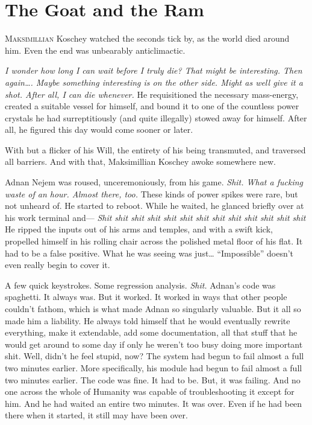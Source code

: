 \chapter{The Goat and the Ram}


\lettrine{M}{aksimillian} Koschey watched the seconds tick by, as the world died around him. Even the end was unbearably anticlimactic.

\emph{I wonder how long I can wait before I truly die? That might be interesting. Then again…. Maybe something interesting is on the other side. Might as well give it a shot. After all, I can die whenever.}
\SmallVSpace
He requisitioned the necessary mass-energy, created a suitable vessel for himself, and bound it to one of the countless power crystals he had surreptitiously (and quite illegally) stowed away for himself. After all, he figured this day would come sooner or later.

With but a flicker of his Will, the entirety of his being transmuted, and traversed all barriers.
\SomeVSpace
And with that, Maksimillian Koschey awoke somewhere new.
\simpleline
{}

Adnan Nejem was roused, unceremoniously, from his game.
\SmallVSpace
\emph{Shit. What a fucking waste of an hour. Almost there, too.}
\SmallVSpace
These kinds of power spikes were rare, but not unheard of. He started to reboot. While he waited, he glanced briefly over at his work terminal and\mbox{---}
\SmallVSpace
\emph{Shit shit shit shit shit shit shit shit shit shit shit shit shit}
\SmallVSpace
He ripped the inputs out of his arms and temples, and with a swift kick, propelled himself in his rolling chair across the polished metal floor of his flat. It had to be a false positive. What he was seeing was just… “Impossible” doesn’t even really begin to cover it.

A few quick keystrokes. Some regression analysis.
\SmallVSpace
\emph{Shit.}
\SmallVSpace
Adnan’s code was spaghetti. It always was. But it worked. It worked in ways that other people couldn’t fathom, which is what made Adnan so singularly valuable. But it all so made him a liability. He always told himself that he would eventually rewrite everything, make it extendable, add some documentation, all that stuff that he would get around to some day if only he weren’t too busy doing more important shit.
\SmallVSpace
Well, didn’t he feel stupid, now?
\SmallVSpace
The system had begun to fail almost a full two minutes earlier. More specifically, his module had begun to fail almost a full two minutes earlier. The code was fine. It had to be. But, it was failing. And no one across the whole of Humanity was capable of troubleshooting it except for him. And he had waited an entire two minutes. It was over. Even if he had been there when it started, it still may have been over.

